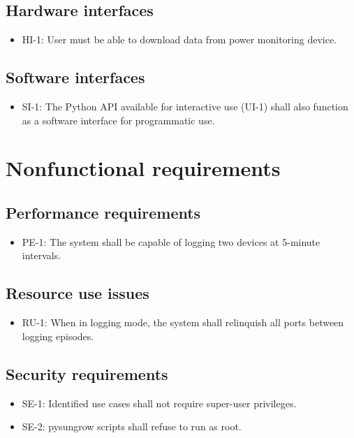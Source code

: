 \documentclass[pdftex,oneside,12pt,a4paper]{book}
\begin{document}
\subsection{Hardware interfaces}
\begin{itemize}
\item HI-1: User must be able to download data from power monitoring device.
\end{itemize}

\subsection{Software interfaces}
\begin{itemize}
\item SI-1: The Python API available for interactive use (UI-1) shall also function as a software interface for programmatic use.
\end{itemize}

\section{Nonfunctional requirements}
\subsection{Performance requirements}
\begin{itemize}
\item PE-1: The system shall be capable of logging two devices at 5-minute intervals.
\end{itemize}

\subsection{Resource use issues}
\begin{itemize}
\item RU-1: When in logging mode, the system shall relinquish all ports between logging episodes.
\end{itemize}

\subsection{Security requirements}
\begin{itemize}
\item SE-1: Identified use cases shall not require super-user privileges.
\item SE-2: pysungrow scripts shall refuse to run as root.
\end{itemize}
\end{document}
